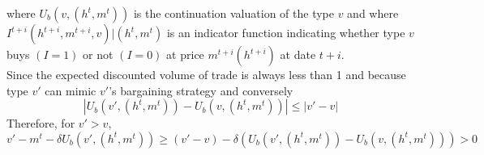 \documentclass[a4paper, 12pt]{article}
\theoremstyle{plain}
\theoremstyle{definition}
\theoremstyle{lemma}
\theoremstyle{remark}
\theoremstyle{corollary}
\theoremstyle{example}
\begin{document}
	where $U_b(v,(h^t,m^t))$ is the continuation valuation of the type $v$ and where $I^{t+i}(h^{t+i},m^{t+i},v)|(h^t,m^t)$ is an indicator function indicating whether type $v$ buys $(I=1)$ or not $(I=0)$ at price $m^{t+i}(h^{t+i})$ at date $t+i$.\\
	Since the expected discounted volume of trade is always less than  1 and because type $v'$ can mimic $v'$'s bargaining strategy and conversely \[\left|U_b(v',(h^t,m^t)) - U_b(v,(h^t,m^t))\right| \leq \left|v'-v\right|\]
	Therefore, for $v'>v$, \[v'-m^t-\delta U_b(v',(h^t,m^t)) \geq (v'-v) - \delta(U_b(v',(h^t,m^t)) - U_b(v,(h^t,m^t))) > 0\]
\end{document}
